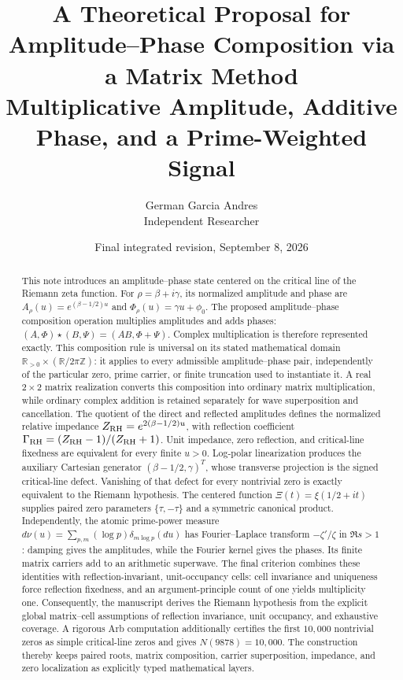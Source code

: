 \documentclass[11pt]{article}
\title{\textbf{A Theoretical Proposal for Amplitude--Phase Composition via a Matrix Method}\\[2mm]
\large Multiplicative Amplitude, Additive Phase, and a Prime-Weighted Signal}
\author{German Garcia Andres\\[1mm]\small Independent Researcher}
\date{Final integrated revision, September 8, 2026}
\begin{document}
\maketitle

\begin{abstract}
This note introduces an amplitude--phase state centered on the critical line of the Riemann
zeta function.  For $\rho=\beta+i\gamma$, its normalized amplitude and phase are
$A_\rho(u)=e^{(\beta-1/2)u}$ and $\Phi_\rho(u)=\gamma u+\phi_0$.  The proposed amplitude--phase composition operation
multiplies amplitudes and adds phases:
$(A,\Phi)\star(B,\Psi)=(AB,\Phi+\Psi)$.  Complex multiplication is therefore represented
exactly.  This composition rule is universal on its stated mathematical domain
$\mathbb R_{>0}\times(\mathbb R/2\pi\mathbb Z)$: it applies to every admissible
amplitude--phase pair, independently of the particular zero, prime carrier, or finite
truncation used to instantiate it.  A real $2\times2$ matrix realization converts this composition into ordinary matrix
multiplication, while ordinary complex addition is retained separately for wave superposition and
cancellation.  The quotient of the direct and reflected amplitudes defines the normalized
relative impedance $Z_{\rm RH}=e^{2(\beta-1/2)u}$, with reflection coefficient
$\Gamma_{\rm RH}=(Z_{\rm RH}-1)/(Z_{\rm RH}+1)$.  Unit impedance, zero reflection, and
critical-line fixedness are equivalent for every finite $u>0$.  Log-polar linearization produces the auxiliary Cartesian generator
$(\beta-1/2,\gamma)^T$, whose transverse projection is the signed critical-line defect.
Vanishing of that defect for every nontrivial zero is exactly equivalent to the Riemann
hypothesis.  The centered function $\Xi(t)=\xi(1/2+it)$ supplies paired zero parameters
$\{\tau,-\tau\}$ and a symmetric canonical product.  Independently, the atomic prime-power
measure $d\nu(u)=\sum_{p,m}(\log p)\delta_{m\log p}(du)$ has Fourier--Laplace transform
$-\zeta'/\zeta$ in $\Re s>1$: damping gives the amplitudes, while the Fourier kernel gives
the phases.  Its finite matrix carriers add to an arithmetic superwave.  The final criterion
combines these identities with reflection-invariant, unit-occupancy cells: cell invariance and
uniqueness force reflection fixedness, and an argument-principle count of one yields
multiplicity one.  Consequently, the manuscript derives the Riemann hypothesis from the
explicit global matrix--cell assumptions of reflection invariance, unit occupancy, and
exhaustive coverage.  A rigorous Arb computation additionally certifies the first $10{,}000$
nontrivial zeros as simple critical-line zeros and gives $N(9878)=10{,}000$.  The construction
thereby keeps paired roots, matrix composition, carrier
superposition, impedance, and zero localization as explicitly typed mathematical layers.
\end{abstract}
\end{document}
